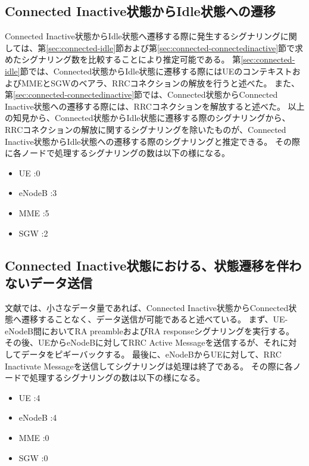 \documentclass[a4j]{ujarticle}
\begin{document}
\subsection{Connected Inactive状態からIdle状態への遷移}
Connected Inactive状態からIdle状態へ遷移する際に発生するシグナリングに関しては、第\ref{sec:connected-idle}節および第\ref{sec:connected-connectedinactive}節で求めたシグナリング数を比較することにより推定可能である。
第\ref{sec:connected-idle}節では、Connected状態からIdle状態に遷移する際にはUEのコンテキストおよびMMEとSGWのベアラ、RRCコネクションの解放を行うと述べた。
また、第\ref{sec:connected-connectedinactive}節では、Connected状態からConnected Inactive状態への遷移する際には、RRCコネクションを解放すると述べた。
以上の知見から、Connected状態からIdle状態に遷移する際のシグナリングから、RRCコネクションの解放に関するシグナリングを除いたものが、Connected Inactive状態からIdle状態への遷移する際のシグナリングと推定できる。
その際に各ノードで処理するシグナリングの数は以下の様になる。
\begin{itemize}
  \item UE      :0
  \item eNodeB  :3
  \item MME     :5
  \item SGW     :2
\end{itemize}
\subsection{Connected Inactive状態における、状態遷移を伴わないデータ送信}
文献\cite{RRCStateHandlingfor5G}では、小さなデータ量であれば、Connected Inactive状態からConnected状態へ遷移することなく、データ送信が可能であると述べている。
まず、UE-eNodeB間においてRA preambleおよびRA responseシグナリングを実行する。
その後、UEからeNodeBに対してRRC Active Messageを送信するが、それに対してデータをピギーバックする。
最後に、eNodeBからUEに対して、RRC Inactivate Messageを送信してシグナリングは処理は終了である。
その際に各ノードで処理するシグナリングの数は以下の様になる。
\begin{itemize}
  \item UE      :4
  \item eNodeB  :4
  \item MME     :0
  \item SGW     :0
\end{itemize}
\end{document}
